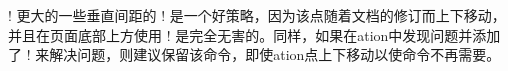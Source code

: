 % 
% 


\!\baselineskip! 更大的一些垂直间距的 \!\ensurevspace! 是一个好策略，因为该点随着文档的修订而上下移动，并且在页面底部上方使用
\!\ensurevspace! 是完全无害的。同样，如果在\sync{}ation中发现问题并添加了 \!\ensurevspace! 来解决问题，则建议保留该命令，即使\sync{}ation点上下移动以使命令不再需要。

% 
%